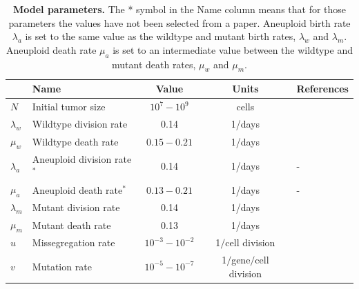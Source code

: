 \documentclass[12pt]{extarticle}
\begin{document}
\begin{table}
\begin{center}
  \begin{tabular}{| l |p{5cm}| c | c | p{3cm} |}
    \hline
     & Name & Value & Units & References \\ \hline
    $N$ & Initial tumor size & $10^7-10^9$ & cells  & \citet{del2009does} \\ \hline
    $\lambda_w$ & Wildtype division rate& 0.14 & 1/days  & \citet{bozic2013evolutionary,rew2000cell} \\ \hline
    $\mu_w$ & Wildtype death rate& $0.15-0.21$ & 1/days  & \citet{bozic2013evolutionary} \\ \hline
    $\lambda_a$  & Aneuploid division rate$^\ast$ & 0.14 & 1/days  & - \\ \hline
    $\mu_a$ & Aneuploid death rate$^\ast$ & $0.13-0.21$ & 1/days  & - \\ \hline
    $\lambda_m$ & Mutant division rate& 0.14 & 1/days  & \citet{bozic2013evolutionary,rew2000cell} \\ \hline
    $\mu_m$ & Mutant death rate& 0.13 & 1/days  & \citet{bozic2013evolutionary,carlson2003tumor} \\ \hline
    $u$ & Missegregation rate& $10^{-3}-10^{-2}$ & 1$\slash$cell division  & \citet{nowak2004evolutionary,bakker2023predicting} \\ \hline
    $v$ & Mutation rate& $10^{-5}-10^{-7}$ &  1$\slash$gene$\slash$cell division  & \citet{nowak2004evolutionary,loeb2001mutator} \\ 
    \hline
  \end{tabular}
\caption{\textbf{Model parameters.} %
The * symbol in the Name column means that for those parameters the values have not been selected from a paper. Aneuploid birth rate $\lambda_a$ is set to the same value as the wildtype and mutant birth rates, $\lambda_w$ and $\lambda_m$.
Aneuploid death rate $\mu_a$ is set to an intermediate value between the wildtype and mutant death rates, $\mu_w$ and $\mu_m$.}
  \label{table1}
\end{center}
\end{table}

\end{document}
